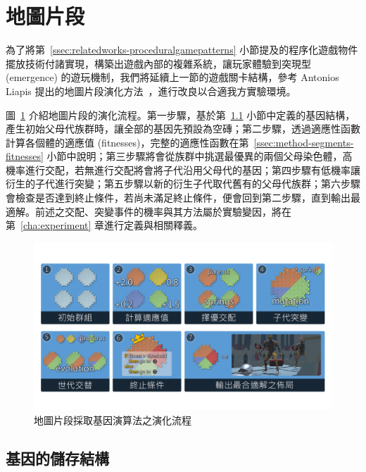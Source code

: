\clearpage

\section{地圖片段}
\label{sec:method-segments}

為了將第~\ref{ssec:relatedworks-proceduralgamepatterns} 小節提及的程序化遊戲物件擺放技術付諸實現，構築出遊戲內部的複雜系統，讓玩家體驗到突現型 (emergence) 的遊玩機制，我們將延續上一節的遊戲關卡結構，參考 Antonios Liapis 提出的地圖片段演化方法~\cite{liapis2017multi}，進行改良以合適我方實驗環境。

圖~\ref{fig:segments-with-ga} 介紹地圖片段的演化流程。第一步驟，基於第~\ref{ssec:method-segments-gene} 小節中定義的基因結構，產生初始父母代族群時，讓全部的基因先預設為空磚；第二步驟，透過適應性函數計算各個體的適應值 (fitnesses)，完整的適應性函數在第~\ref{ssec:method-segments-fitnesses} 小節中說明；第三步驟將會從族群中挑選最優異的兩個父母染色體，高機率進行交配，若無進行交配將會將子代沿用父母代的基因；第四步驟有低機率讓衍生的子代進行突變；第五步驟以新的衍生子代取代舊有的父母代族群；第六步驟會檢查是否達到終止條件，若尚未滿足終止條件，便會回到第二步驟，直到輸出最適解。前述之交配、突變事件的機率與其方法屬於實驗變因，將在第~\ref{cha:experiment} 章進行定義與相關釋義。

\begin{figure}[!htb]
  \begin{center}
    \includegraphics[width=1.0\textwidth]{figures/segments-with-ga.pdf}
    \caption{地圖片段採取基因演算法之演化流程} 
    \label{fig:segments-with-ga}
  \end{center}
\end{figure}

\subsection{基因的儲存結構}
\label{ssec:method-segments-gene}

